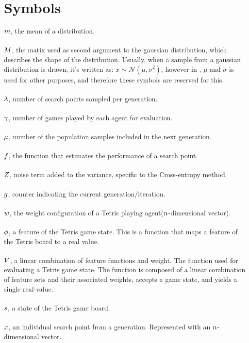 \clearpage
\section*{Symbols}

$m$, the mean of a distribution.\\
\\
$M$, the matix used as 
second argument to the gaussian distribution, 
which describes the shape of the distribution. 
Usually, when a sample from a gaussian distribution 
is drawn, it's written as: 
$x \sim \mathcal{N} \left( \mu, \sigma^{2} \right)$, 
however in \citep{hansen2011},
$\mu$ and $\sigma$ is used for other 
purposes, and therefore these symbols are reserved for this.\\
\\
$\lambda$, number of search points sampled per generation.\\
\\
$\gamma$, number of games played by each agent for evaluation.\\
\\
$\mu$, number of the population samples included in the next generation.\\
\\
$f$, the function that estimates the performance of a search point.\\
\\
$Z$, noise term added to the variance, specific to the Cross-entropy method.\\
\\
$g$, counter indicating the current generation/iteration.\\
\\
$w$, the weight configuration of a Tetris playing agent($n $-dimensional vector).\\
\\
$\phi$, a feature of the Tetris game state. This is a function that maps a 
feature of the Tetris board to a real value.\\
\\
$V$, a linear combination of feature functions and weight. 
The function used for evaluating a Tetris game state. 
The function is composed of a linear combination of feature sets and their
associated weights, accepts a game state, and yields a single real-value.\\
\\
$s$, a state of the Tetris game board.\\
\\
$x$, an individual search point from a generation. 
Represented with an $n$-dimensional vector.

\clearpage

